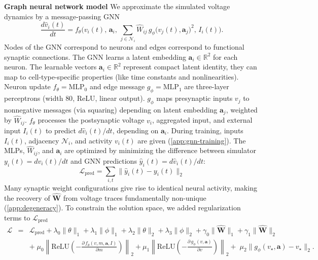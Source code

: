\documentclass{article}
\begin{document}
\textbf{Graph neural network model}\label{method:GNN}
We approximate the simulated voltage dynamics by a message-passing GNN \citep{gilmer_neural_2017}
\begin{equation}
\frac{d\hat{v}_i(t)}{dt}
= f_\theta\!\Big(v_i(t),\,\mathbf{a}_i,\,
\sum_{j\in\mathcal{N}_i} \hat{W}_{ij}\,
g_\phi\!\big(v_j(t),\mathbf{a}_j\big)^2,\,
I_i(t)\Big).
\label{eq:gnn_ct}
\end{equation}
Nodes of the GNN correspond to neurons and edges correspond to functional synaptic connections. The GNN learns a latent embedding $\mathbf{a}_i\in\mathbb{R}^2$ for each neuron. The learnable vectors $\mathbf{a}_i\in\mathbb{R}^2$ represent compact latent identity, they can map to cell-type-specific properties (like time constants and nonlinearities). Neuron update $f_\theta=\text{MLP}_0$ and edge message $g_\phi=\text{MLP}_1$ are three-layer perceptrons (width $80$, ReLU, linear output). $g_\phi$ maps presynaptic inputs $v_j$ to nonnegative messages (via squaring) depending on latent embedding $\mathbf{a}_j$, weighted by $\hat{W}_{ij}$. $f_\theta$ processes the postsynaptic voltage $v_i$, aggregated input, and external input $I_i(t)$ to predict $d\hat{v}_i(t)/dt$, depending on $\mathbf{a}_i$. During training, inputs $I_i(t)$, adjacency $\mathcal{N}_i$, and activity $v_i(t)$ are given (\cref{app:gnn-training}). The MLPs, $\hat{W}_{ij}$, and $\mathbf{a}_i$ are optimized by minimizing the difference between simulator $y_i(t)=dv_i(t)/dt$ and GNN predictions $\hat{y}_i(t)=d\hat{v}_i(t)/dt$:
\begin{equation}
\mathcal{L}_{\mathrm{pred}} = \sum_{i,t}\|\hat{y}_i(t) - y_i(t)\|_2
\label{eq:loss_pred}
\end{equation}
Many synaptic weight configurations give rise to identical neural activity, making the recovery of $\hat{\mathbf{W}}$ from voltage traces fundamentally non-unique (\cref{app:degeneracy}). To constrain the solution space, we added regularization terms to $\mathcal{L}_{\mathrm{pred}}$
\begin{eqnarray}
\mathcal{L} &=& \mathcal{L}_{\mathrm{pred}}
+ \lambda_0\|\theta\|_1 + \lambda_1\|\phi\|_1 + \lambda_2\|\theta\|_2 + \lambda_3\|\phi\|_2
+ \gamma_0\|\hat{\mathbf{W}}\|_1 + \gamma_1\|\hat{\mathbf{W}}\|_2 \nonumber\\
&& +\; \mu_0\!\left\|\mathrm{ReLU}\!\left(-\tfrac{\partial\,f_\theta(v,m,\mathbf{a},I)}{\partial m}\right)\right\|_2
+ \mu_1\!\left\|\mathrm{ReLU}\!\left(-\tfrac{\partial\,g_\phi(v,\mathbf{a})}{\partial v}\right)\right\|_2 \nonumber +\; \mu_2\|g_\phi(v_\star,\mathbf{a})-v_\star\|_2.
\label{eq:loss_full}
\end{eqnarray}
\end{document}
